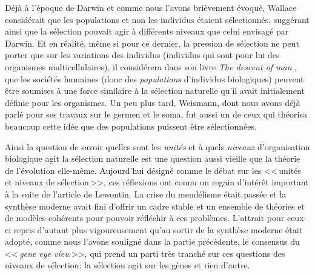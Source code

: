 Déjà à l'époque de Darwin et comme nous l'avons brièvement évoqué, Wallace considérait que les populations et non les individus étaient sélectionnés, suggérant ainsi que la sélection pouvait agir à différents niveaux que celui envisagé par Darwin. Et en réalité, même si pour ce dernier, la pression de sélection ne peut porter que sur les variations des individus (individus qui sont pour lui des organismes multicellulaires), il considérera dans son livre \emph{The descent of man} \citep{darwin1871thedescentofman}, que les sociétés humaines (donc des \emph{populations} d'individus biologiques) peuvent être soumises à une force similaire à la sélection naturelle qu'il avait initialement définie pour les organismes. Un peu plus tard, Weismann, dont nous avons déjà parlé pour ses travaux sur le germen et le soma, fut aussi un de ceux qui théorisa beaucoup cette idée que des populations puissent être sélectionnées.

Ainsi la question de savoir quelles sont les \emph{unités} et à quels \emph{niveaux} d'organisation biologique agit la sélection naturelle est une question aussi vieille que la théorie de l'évolution elle-même. Aujourd'hui désigné comme le débat sur les <<\,unités et niveaux de sélection\,>>, ces réflexions ont connu un regain d'intérêt important à la suite de l'article de Lewontin. La crise du mendélisme était passée et la synthèse moderne avait fini d'offrir un cadre stable et un ensemble de théories et de modèles cohérents pour pouvoir réfléchir à ces problèmes. L'attrait pour ceux-ci repris d'autant plus vigoureusement qu'au sortir de la synthèse moderne était adopté, comme nous l'avons souligné dans la partie précédente, le consensus du <<\,\emph{gene eye view}\,>>, qui prend un parti très tranché sur ces questions des niveaux de sélection: la sélection agit sur les gènes et rien d'autre. 

